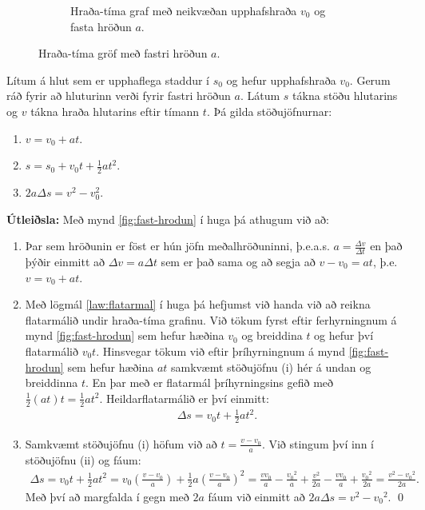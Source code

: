 \ifdefined \wholebook \else\documentclass[oneside]{book}\usepackage{EdlBook}\graphicspath{{figures/}}
\begin{document}
\begin{figure}[H]
\begin{subfigure}[h]{.4\textwidth}
    \caption{Hraða-tíma graf með neikvæðan upphafshraða $v_0$ og fasta hröðun $a$.}
    \label{fig:neikvaett-hrodun}
\end{subfigure}
\caption{Hraða-tíma gröf með fastri hröðun $a$.}
\end{figure}


\begin{tcolorbox}
\begin{theorem}
Lítum á hlut sem er upphaflega staddur í $s_0$ og hefur upphafshraða $v_0$. Gerum ráð fyrir að hluturinn verði fyrir fastri hröðun $a$. Látum $s$ tákna stöðu hlutarins og $v$ tákna hraða hlutarins eftir tímann $t$. Þá gilda stöðujöfnurnar:

\begin{enumerate}[label = \textbf{(\roman*)}]
    \item $v = v_0 + at$.

    \item $s = s_0 + v_0 t + \frac{1}{2}at^2$.
    
    \item $2a \Delta s = v^2 - v_0^2$.
\end{enumerate}
\end{theorem}
\end{tcolorbox}


\textbf{Útleiðsla:}
Með mynd \ref{fig:fast-hrodun} í huga þá athugum við að:
\begin{enumerate}[label = \textbf{(\roman*)}]
    \item Þar sem hröðunin er föst er hún jöfn meðalhröðuninni, þ.e.a.s. $a = \frac{\Delta v}{\Delta t}$ en það þýðir einmitt að $\Delta v = a \Delta t$ sem er það sama og að segja að $v - v_0 = at$, þ.e. $v = v_0 + at$.
    
    \item Með lögmál \ref{law:flatarmal} í huga þá hefjumst við handa við að reikna flatarmálið undir hraða-tíma grafinu. Við tökum fyrst eftir ferhyrningnum á mynd \ref{fig:fast-hrodun} sem hefur hæðina $v_0$ og breiddina $t$ og hefur því flatarmálið $v_0 t$. Hinsvegar tökum við eftir þríhyrningnum á mynd \ref{fig:fast-hrodun} sem hefur hæðina $at$ samkvæmt stöðujöfnu (i) hér á undan og breiddinna $t$. En þar með er flatarmál þríhyrningsins gefið með $\frac{1}{2} (at) t = \frac{1}{2}at
   ^2$. Heildarflatarmálið er því einmitt:
   \begin{align*}
       \Delta s = v_0 t + \frac{1}{2}at^2.
   \end{align*}
   
   \item Samkvæmt stöðujöfnu (i) höfum við að $t = \frac{v-v_0}{a}$. Við stingum því inn í stöðujöfnu (ii) og fáum:
   \begin{align*}
       \Delta s = v_0 t + \frac{1}{2}a t^2 = v_0 \left( \frac{v-v_0}{a} \right) + \frac{1}{2}a \left( \frac{v-v_0}{a} \right)^2 = \frac{v v_0}{a} -\frac{{v_0}^2}{a} + \frac{v^2}{2a} - \frac{v v_0}{a} + \frac{{v_0}^2}{2a} = \frac{v^2-{v_0}^2}{2a}. 
   \end{align*}
   Með því að margfalda í gegn með $2a$ fáum við einmitt að $2a \Delta s = v^2 - {v_0}^2$. \qed
\end{enumerate}
\end{document}
